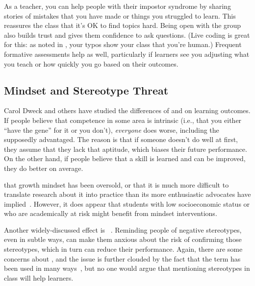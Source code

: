 As a teacher,
you can help people with their impostor syndrome
by sharing stories of mistakes that you have made or things you struggled to learn.
This reassures the class that it's OK to find topics hard.
Being open with the group also builds trust
and gives them confidence to ask questions.
(Live coding is great for this:
as noted in ,
your typos show your class that you're human.)
Frequent formative assessments help as well,
particularly if learners see you adjusting what you teach or how quickly you go
based on their outcomes.

\subsection*{Mindset and Stereotype Threat}

Carol Dweck and others have studied the differences of 
and  on learning outcomes.
If people believe that competence in some area is intrinsic
(i.e., that you either ``have the gene'' for it or you don't),
\emph{everyone} does worse,
including the supposedly advantaged.
The reason is that if someone doesn't do well at first,
they assume that they lack that aptitude,
which biases their future performance.
On the other hand,
if people believe that a skill is learned and can be improved,
they do better on average.

that growth mindset has been oversold,
or that it is much more difficult to translate research about it into practice
than its more enthusiastic advocates have implied~\cite{Sisk2018}.
However,
it does appear that students with low socioeconomic status or who are academically at risk might benefit from mindset interventions.

Another widely-discussed effect is ~\cite{Stee2011}.
Reminding people of negative stereotypes,
even in subtle ways,
can make them anxious about the risk of confirming those stereotypes,
which in turn can reduce their performance.
Again,
there are some concerns about
,
and the issue is further clouded by the fact that the term has been used in many ways~\cite{Shap2007},
but no one would argue that mentioning stereotypes in class will help learners.

